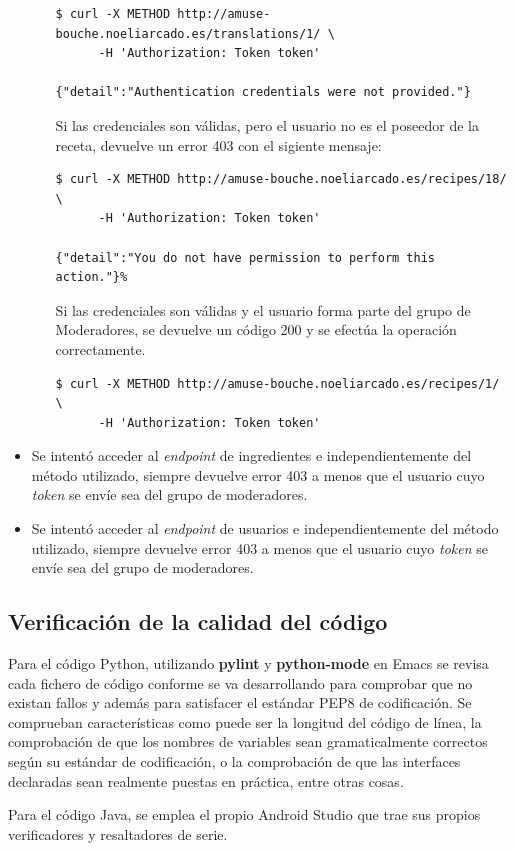 \begin{itemize}
\begin{itemize}
    \begin{verbatim}
$ curl -X METHOD http://amuse-bouche.noeliarcado.es/translations/1/ \
      -H 'Authorization: Token token'

{"detail":"Authentication credentials were not provided."}            
    \end{verbatim}

    Si las credenciales son válidas, pero el usuario no es el poseedor de la
    receta, devuelve un error 403 con el sigiente mensaje:

    \begin{verbatim}
$ curl -X METHOD http://amuse-bouche.noeliarcado.es/recipes/18/ \
      -H 'Authorization: Token token'

{"detail":"You do not have permission to perform this action."}%               
    \end{verbatim}

    Si las credenciales son válidas y el usuario forma parte del grupo de
    Moderadores, se devuelve un código 200 y se efectúa la operación correctamente.

    \begin{verbatim}
$ curl -X METHOD http://amuse-bouche.noeliarcado.es/recipes/1/ \
      -H 'Authorization: Token token'    
    \end{verbatim}
    
  \end{itemize}
  
\item Se intentó acceder al \textit{endpoint} de ingredientes e independientemente
  del método utilizado, siempre devuelve error 403 a menos que el usuario
  cuyo \textit{token} se envíe sea del grupo de moderadores.
\item Se intentó acceder al \textit{endpoint} de usuarios e independientemente
  del método utilizado, siempre devuelve error 403 a menos que el usuario
  cuyo \textit{token} se envíe sea del grupo de moderadores.
\end{itemize}

\subsection{Verificación de la calidad del código}

Para el código Python, utilizando \textbf{pylint} y \textbf{python-mode} en
Emacs se revisa cada fichero de código conforme se va desarrollando para
comprobar que no existan fallos y además para satisfacer el estándar PEP8 de
codificación. Se comprueban características como puede ser la longitud del
código de línea, la comprobación de que los nombres de variables sean
gramaticalmente correctos según su estándar de codificación, o la comprobación
de que las interfaces declaradas sean realmente puestas en práctica, entre otras
cosas.

Para el código Java, se emplea el propio Android Studio que trae sus propios
verificadores y resaltadores de serie.
